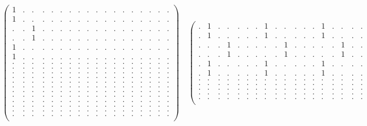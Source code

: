 \documentclass[12pt,a4paper]{amsart}
\begin{document}
\begin{align*}
\left(\begin{array}{rrrrrr|rrrrrr|rrrrrr}%
1&.&.&.&.&.&.&.&.&.&.&.&.&.&.&.&.&.\\%
1&.&.&.&.&.&.&.&.&.&.&.&.&.&.&.&.&.\\%
.&.&1&.&.&.&.&.&.&.&.&.&.&.&.&.&.&.\\%
.&.&1&.&.&.&.&.&.&.&.&.&.&.&.&.&.&.\\%
1&.&.&.&.&.&.&.&.&.&.&.&.&.&.&.&.&.\\%
1&.&.&.&.&.&.&.&.&.&.&.&.&.&.&.&.&.\\ \hline
.&.&.&.&.&.&.&.&.&.&.&.&.&.&.&.&.&.\\%
.&.&.&.&.&.&.&.&.&.&.&.&.&.&.&.&.&.\\%
.&.&.&.&.&.&.&.&.&.&.&.&.&.&.&.&.&.\\%
.&.&.&.&.&.&.&.&.&.&.&.&.&.&.&.&.&.\\%
.&.&.&.&.&.&.&.&.&.&.&.&.&.&.&.&.&.\\%
.&.&.&.&.&.&.&.&.&.&.&.&.&.&.&.&.&.\\ \hline
.&.&.&.&.&.&.&.&.&.&.&.&.&.&.&.&.&.\\%
.&.&.&.&.&.&.&.&.&.&.&.&.&.&.&.&.&.\\%
.&.&.&.&.&.&.&.&.&.&.&.&.&.&.&.&.&.\\%
.&.&.&.&.&.&.&.&.&.&.&.&.&.&.&.&.&.\\%
.&.&.&.&.&.&.&.&.&.&.&.&.&.&.&.&.&.\\%
.&.&.&.&.&.&.&.&.&.&.&.&.&.&.&.&.&.\\%
\end{array}\right)%
\quad
\left(\begin{array}{rrrrrr|rrrrrr|rrrrrr}%
.&1&.&.&.&.&.&1&.&.&.&.&.&1&.&.&.&.\\%
.&1&.&.&.&.&.&1&.&.&.&.&.&1&.&.&.&.\\%
.&.&.&1&.&.&.&.&.&1&.&.&.&.&.&1&.&.\\%
.&.&.&1&.&.&.&.&.&1&.&.&.&.&.&1&.&.\\%
.&1&.&.&.&.&.&1&.&.&.&.&.&1&.&.&.&.\\%
.&1&.&.&.&.&.&1&.&.&.&.&.&1&.&.&.&.\\ \hline
.&.&.&.&.&.&.&.&.&.&.&.&.&.&.&.&.&.\\%
.&.&.&.&.&.&.&.&.&.&.&.&.&.&.&.&.&.\\%
.&.&.&.&.&.&.&.&.&.&.&.&.&.&.&.&.&.\\%
.&.&.&.&.&.&.&.&.&.&.&.&.&.&.&.&.&.\\%
.&.&.&.&.&.&.&.&.&.&.&.&.&.&.&.&.&.\\%

\end{array}
\end{align*}
\end{document}
